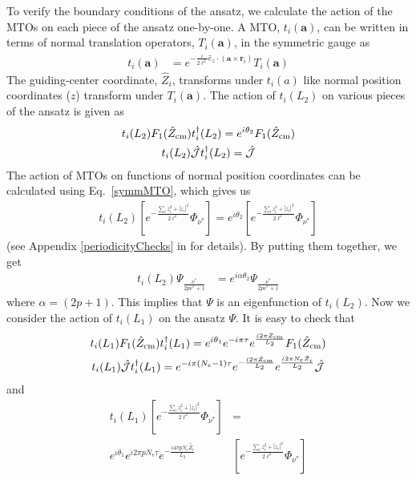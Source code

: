 \documentclass[prb,aps,epsfig,longbibliography,twocolumn]{revtex4-1}
\newcommand{\bsym}[1]{\boldsymbol{#1}}
\newcommand{\sbkt}[1]{\left[ #1\right]}
\newcommand{\iiota}{\dot{\iota}}
\begin{document}
To verify the boundary conditions of the ansatz, we calculate the action of the MTOs on each piece of the ansatz one-by-one. A MTO, $t_i(\bsym{a})$, can be written in terms of normal translation operators, $T_i(\bsym{a})$, in the symmetric gauge as
\begin{align}
t_i(\bsym{a}) &= e^{-\frac{\iiota}{2\ell^2}\hat{e}_z\cdot (\bsym{a}\times \bsym{r}_i)}T_i(\bsym{a}) \label{symmMTO}
\end{align}
The guiding-center coordinate, $\hat{Z}_i$, transforms under $t_i(a)$ like normal position coordinates ($z$) transform under  $T_i(\bsym{a})$. The action of $t_i(L_2)$ on various pieces of the ansatz is given as
\begin{gather}
	t_i(L_2)F_1(\hat{Z}_{\rm cm})t^{\dagger}_i(L_2)=e^{\iiota \theta_2}F_1(\hat{Z}_{\rm cm}) \label{FirstEqFail}\\
	t_i(L_2)\hat{\mathcal{J}}t^{\dagger}_i(L_2)=\hat{\mathcal{J}}
\end{gather}
The action of MTOs on functions of normal position coordinates can be calculated using Eq.~\eqref{symmMTO}, which gives us
\begin{align}
	t_i(L_2)\sbkt{e^{-\frac{\sum_i z^2_i+|z_i|^2 }{2\ell^2}}\Phi_{\nu^*}}=e^{\iiota \theta_2}\sbkt{e^{-\frac{\sum_i z^2_i+|z_i|^2 }{2\ell^2}}\Phi_{\nu^*}} \label{WrongWF1}
\end{align}
(see Appendix \ref{periodicityChecks} in  for details). By putting them together, we get
\begin{align}
t_i(L_2)\Psi_{\frac{\nu^*}{2p\nu^*+1}}&=e^{i\alpha\theta_2}\Psi_{\frac{\nu^*}{2p\nu^*+1}}\label{pb1}
\end{align}
where $\alpha=(2p+1)$. This implies that $\Psi$ is an eigenfunction of $t_i(L_2)$. Now we consider the action of $t_i(L_1)$ on the ansatz $\Psi$.  It is easy to check that
\begin{gather}
t_i(L_1)F_1(\hat{Z}_{\rm cm})t^{\dagger}_i(L_1)=e^{\iiota \theta_1}e^{-\iiota \pi \tau}e^{\frac{ \iiota 2\pi \hat{Z}_{\rm cm}}{L_2}} F_1(\hat{Z}_{\rm cm}) \label{t1_1}\\
t_i(L_1)\hat{\mathcal{J}}t^{\dagger}_i(L_1)=e^{-\iiota \pi(N_e-1) \tau}e^{-\frac{ \iiota 2\pi \hat{Z}_{\rm cm}}{L_2}}e^{\frac{ \iiota 2\pi N_e\hat{Z}_i}{L_2}}\hat{\mathcal{J}} \label{t1_2}
\end{gather}
and
\begin{align} 
t_i(L_1)\sbkt{e^{-\frac{\sum_i z^2_i+|z_i|^2 }{2\ell^2}}\Phi_{\nu^*}}&=\nonumber \\
e^{\iiota \theta_1}e^{\iiota 2\pi pN_e \tau }e^{-\frac{ \iiota 4\pi p N_e{\hat{Z}}_i}{L_2}}&\sbkt{e^{-\frac{\sum_i z^2_i+|z_i|^2 }{2\ell^2}}\Phi_{\nu^*}} \label{lastEqFail}
\end{align}
\end{document}
